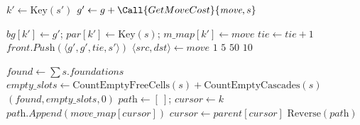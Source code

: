 \begin{algorithm}[H]
    \caption{UCS - Successor Expansion \& Cost}
    \label{alg:ucs_expand}
    \begin{algorithmic}[1]
                \State $k' \gets \text{Key}(s')$
                \State $g' \gets g + \Call{GetMoveCost}{\textit{move}, s}$
                
                    \State $\textit{bg}[k'] \gets g'$; \quad $\textit{par}[k'] \gets \text{Key}(s)$; \quad $\textit{m\_map}[k'] \gets \textit{move}$
                    \State {}
                    \State $\textit{tie} \gets \textit{tie} + 1$
                    \State $\textit{front.Push}(\langle g', g', \textit{tie}, s' \rangle)$
                \EndIf
            \EndFor
        \EndFunction
        \Statex
            \State $\langle \textit{src}, \textit{dst} \rangle \gets \textit{move}$
             \Return $1$ \EndIf
             \Return $5$ \EndIf
             \Return $50$ \EndIf
            \Return $10$ 
        \EndFunction
    \end{algorithmic}
\end{algorithm}
\begin{algorithm}[H]
    \caption{UCS - Helper Functions}
    \label{alg:ucs_helpers}
    \begin{algorithmic}[1]
            \State $\textit{found} \gets \sum \textit{s.foundations}$
            \State $\textit{empty\_slots} \gets \text{CountEmptyFreeCells}(s) + \text{CountEmptyCascades}(s)$
            \State \Return $(\textit{found}, \textit{empty\_slots}, 0)$ 
        \EndFunction
        \Statex
            \State $\textit{path} \gets [\ ]$; \quad $\textit{cursor} \gets k$
                \State $\textit{path.Append}(\textit{move\_map}[\textit{cursor}])$
                \State $\textit{cursor} \gets \textit{parent}[\textit{cursor}]$
            \EndWhile
            \State \Return $\text{Reverse}(\textit{path})$
        \EndFunction
    \end{algorithmic}
\end{algorithm}
